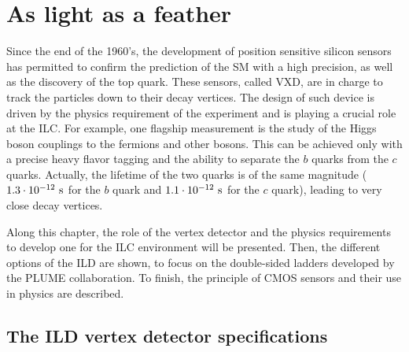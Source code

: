 \chapter{As light as a feather}
\label{chap:vxd}
  
  Since the end of the 1960's, the development of position sensitive silicon sensors has permitted to confirm the prediction of the \acrfull{SM} with a high precision, as well as the discovery of the top quark.
  These sensors, called \acrfull{VXD}, are in charge to track the particles down to their decay vertices.
  The design of such device is driven by the physics requirement of the experiment and is playing a crucial role at the \acrfull{ILC}.
  For example, one flagship measurement is the study of the Higgs boson couplings to the fermions and other bosons.
  This can be achieved only with a precise heavy flavor tagging and the ability to separate the $b$ quarks from the $c$ quarks. 
  Actually, the lifetime of the two quarks is of the same magnitude ($1.3 \cdot 10^{-12}~\rm{s}$ for the $b$ quark and $1.1 \cdot 10^{-12}~\rm{s}$ for the $c$ quark), leading to very close decay vertices. 
  
  Along this chapter, the role of the vertex detector and the physics requirements to develop one for the \gls{ILC} environment will be presented.
  Then, the different options of the \acrfull{ILD} are shown, to focus on the double-sided ladders developed by the \gls{PLUME} collaboration.
  To finish, the principle of \gls{CMOS} sensors and their use in physics are described.

  \minitoc
  
  \section{The ILD vertex detector specifications}
   
